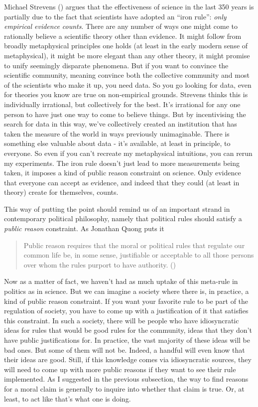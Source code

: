\documentclass[
  10pt,
  letterpaper,
  twoside]{scrbook}
\begin{document}
Michael Strevens () argues that the
effectiveness of science in the last 350 years is partially due to the
fact that scientists have adopted an ``iron rule'': \emph{only empirical
evidence counts}. There are any number of ways one might come to
rationally believe a scientific theory other than evidence. It might
follow from broadly metaphysical principles one holds (at least in the
early modern sense of metaphysical), it might be more elegant than any
other theory, it might promise to unify seemingly disparate phenomena.
But if you want to convince the scientific community, meaning convince
both the collective community and most of the scientists who make it up,
you need data. So you go looking for data, even for theories you know
are true on non-empirical grounds. Strevens thinks this is individually
irrational, but collectively for the best. It's irrational for any one
person to have just one way to come to believe things. But by
incentivising the search for data in this way, we've collectively
created an institution that has taken the measure of the world in ways
previously unimaginable. There is something else valuable about data -
it's available, at least in principle, to everyone. So even if you can't
recreate my metaphysical intuitions, you can rerun my experiments. The
iron rule doesn't just lead to more measurements being taken, it imposes
a kind of public reason constraint on science. Only evidence that
everyone can accept as evidence, and indeed that they could (at least in
theory) create for themselves, counts.

This way of putting the point should remind us of an important strand in
contemporary political philosophy, namely that political rules should
satisfy a \emph{public reason} constraint. As Jonathan Quong puts it

\begin{quote}
Public reason requires that the moral or political rules that regulate
our common life be, in some sense, justifiable or acceptable to all
those persons over whom the rules purport to have authority.
()
\end{quote}

Now as a matter of fact, we haven't had as much uptake of this meta-rule
in politics as in science. But we can imagine a society where there is,
in practice, a kind of public reason constraint. If you want your
favorite rule to be part of the regulation of society, you have to come
up with a justification of it that satisfies this constraint. In such a
society, there will be people who have idiosyncratic ideas for rules
that would be good rules for the community, ideas that they don't have
public justifications for. In practice, the vast majority of these ideas
will be bad ones. But some of them will not be. Indeed, a handful will
even know that their ideas are good. Still, if this knowledge comes via
idiosyncratic sources, they will need to come up with more public
reasons if they want to see their rule implemented. As I suggested in
the previous subsection, the way to find reasons for a moral claim is
generally to inquire into whether that claim is true. Or, at least, to
act like that's what one is doing.
\end{document}
